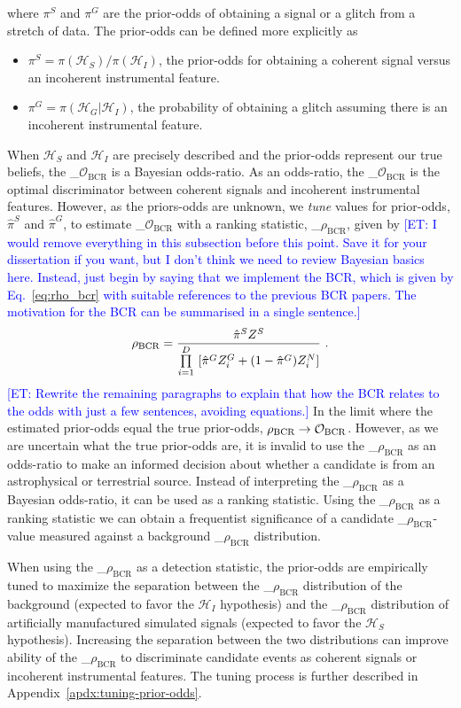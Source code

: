 \documentclass[%
 nofootinbib,
 amsmath,amssymb,
 aps,
 twocolumn,
 superscriptaddress
]{revtex4-2}
\newcommand{\mathcmd}[1]{{\sc \relax\ifmmode#1\else $#1$\fi}\xspace}
\newcommand{\bcr}{\mathcmd{\rho_\text{BCR}}}
\newcommand{\bcrodds}{\mathcmd{\mathcal{O}_{\mathrm{BCR}}}}
\newcommand{\et}[1]{\textcolor{blue}{[ET: #1]}}
\begin{document}
where $\pi^S$ and $\pi^G$ are the prior-odds of obtaining a signal or a glitch from a stretch of data. The prior-odds can be defined more explicitly as 
\begin{itemize}
    \item $\pi^S=\pi(\mathcal{H}_S)/\pi(\mathcal{H}_I)$, the prior-odds for obtaining a coherent signal versus an incoherent instrumental feature.
    \item $\pi^G=\pi(\mathcal{H}_G| \mathcal{H}_I)$, the probability of obtaining a glitch assuming there is an incoherent instrumental feature.
\end{itemize}



When $\mathcal{H}_S$ and $\mathcal{H}_I$ are precisely described and the prior-odds represent our true beliefs, the \bcrodds is a Bayesian odds-ratio. As an odds-ratio, the \bcrodds is the optimal discriminator between coherent signals and incoherent instrumental features. However, as the priors-odds are unknown, we \textit{tune} values for prior-odds, $\hat{\pi}^S$ and $\hat{\pi}^G$, to estimate \bcrodds with a ranking statistic, \bcr, given by
\et{I would remove everything in this subsection before this point. Save it for your dissertation if you want, but I don't think we need to review Bayesian basics here. Instead, just begin by saying that we implement the BCR, which is given by Eq.~\ref{eq:rho_bcr} with suitable references to the previous BCR papers. The motivation for the BCR can be summarised in a single sentence.}
\begin{equation}
\label{eq:rho_bcr}
\bcr = \frac{\hat{\pi}^S Z^S}{\prod\limits^D_{i=1} \ [\hat{\pi}^G Z^G_i + (1-\hat{\pi}^G)Z^N_i]}\ .
\end{equation}
\et{Rewrite the remaining paragraphs to explain that how the BCR relates to the odds with just a few sentences, avoiding equations.}
In the limit where the estimated prior-odds equal the true prior-odds, $\bcr\to\bcrodds$. However, as we are uncertain what the true prior-odds are, it is invalid to use the \bcr as an odds-ratio to make an informed decision about whether a candidate is from an astrophysical or terrestrial source. Instead of interpreting the \bcr as a Bayesian odds-ratio, it can be used as a ranking statistic. Using the \bcr as a ranking statistic we can obtain a frequentist significance of a candidate \bcr-value measured against a background \bcr distribution. 

When using the \bcr as a detection statistic, the prior-odds are empirically tuned to maximize the separation between the \bcr distribution of the background (expected to favor the $\mathcal{H}_I$ hypothesis) and the \bcr distribution of artificially manufactured simulated signals (expected to favor the $\mathcal{H}_S$ hypothesis). Increasing the separation between the two distributions can improve ability of the \bcr to discriminate candidate events as coherent signals or incoherent instrumental features. The tuning process is further described in Appendix~\ref{apdx:tuning-prior-odds}. 
\end{document}
